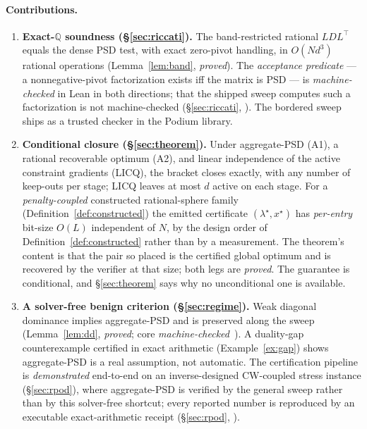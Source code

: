 \documentclass[11pt]{article}
\theoremstyle{definition}
\theoremstyle{remark}
\newcommand{\Q}{\mathbb{Q}}
\renewcommand{\_}{\ifdim\fontdimen3\font=0pt\relax\char`\_\else\textunderscore\fi\hspace{0pt}}
\begin{document}
\paragraph{Contributions.}
\begin{enumerate}
\item \textbf{Exact-$\Q$ soundness (\S\ref{sec:riccati}).} The band-restricted
rational $LDL^\top$ equals the dense PSD test, with exact zero-pivot handling,
in $O(Nd^3)$ rational operations (Lemma~\ref{lem:band}, \emph{proved}). The
\emph{acceptance predicate} --- a nonnegative-pivot factorization exists iff
the matrix is PSD --- is \emph{machine-checked} in Lean in both directions;
that the shipped sweep computes such a factorization is not machine-checked
(\S\ref{sec:riccati}, \cite{leannote}). The bordered sweep ships as a trusted
checker in the Podium library.
\item \textbf{Conditional closure (\S\ref{sec:theorem}).} Under aggregate-PSD
(A1), a rational recoverable optimum (A2), and linear independence of the
active constraint gradients (LICQ), the bracket closes exactly, with any
number of keep-outs per stage; LICQ leaves at most $d$ active on each stage.
For a \emph{penalty-coupled} constructed rational-sphere family
(Definition~\ref{def:constructed}) the emitted certificate
$(\lambda^\star,x^\star)$ has \emph{per-entry} bit-size $O(L)$ independent of
$N$, by the design order of Definition~\ref{def:constructed} rather than by a
measurement. The theorem's content is that the pair so placed is the certified
global optimum and is recovered by the verifier at that size; both legs are
\emph{proved}. The guarantee is conditional, and \S\ref{sec:theorem} says why
no unconditional one is available.
\item \textbf{A solver-free benign criterion (\S\ref{sec:regime}).} Weak
diagonal dominance implies aggregate-PSD and is preserved along the sweep
(Lemma~\ref{lem:dd}, \emph{proved}; core
\emph{machine-checked}~\cite{leannote}). A duality-gap counterexample
certified in exact arithmetic (Example~\ref{ex:gap}) shows aggregate-PSD is a
real assumption, not automatic. The certification pipeline is \emph{demonstrated}
end-to-end on an inverse-designed CW-coupled stress instance
(\S\ref{sec:rpod}), where aggregate-PSD is verified by the general sweep
rather than by this solver-free shortcut; every reported number is reproduced
by an executable exact-arithmetic receipt (\S\ref{sec:rpod},
\cite{leannote}).
\end{enumerate}
\end{document}
